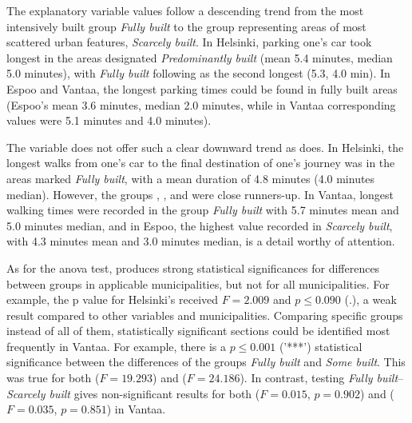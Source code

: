 The explanatory variable  values follow a descending trend from the most intensively built group \textit{Fully built} to the group representing areas of most scattered urban features, \textit{Scarcely built}. In Helsinki, parking one's car took longest in the areas designated \textit{Predominantly built} (mean 5.4 minutes, median 5.0 minutes), with \textit{Fully built} following as the second longest (5.3, 4.0 min). In Espoo and Vantaa, the longest parking times could be found in fully built areas (Espoo's mean 3.6 minutes, median 2.0 minutes, while in Vantaa corresponding values were 5.1 minutes and 4.0 minutes).

The variable  does not offer such a clear downward trend as  does. In Helsinki, the longest walks from one's car to the final destination of one's journey was in the areas marked \textit{Fully built}, with a mean duration of 4.8 minutes (4.0 minutes median). However, the groups , , and  were close runners-up. In Vantaa, longest walking times were recorded in the group \textit{Fully built} with 5.7 minutes mean and 5.0 minutes median, and in Espoo, the highest value recorded in \textit{Scarcely built}, with 4.3 minutes mean and 3.0 minutes median, is a detail worthy of attention.

As for the \acrshort{anova} test,  produces strong statistical significances for differences between groups in applicable municipalities, but not for all municipalities. For example, the p value for Helsinki's  received $F = 2.009$ and $p \leq 0.090$ (.), a weak result compared to other variables and municipalities. Comparing specific groups instead of all of them, statistically significant sections could be identified most frequently in Vantaa. For example, there is a $p \leq 0.001$ ('***') statistical significance between the differences of the groups \textit{Fully built} and \textit{Some built}. This was true for both  ($F = 19.293$) and  ($F = 24.186$). In contrast, testing \textit{Fully built}--\textit{Scarcely built} gives non-significant results for both  ($F = 0.015$, $p = 0.902$) and  ($F = 0.035$, $p = 0.851$) in Vantaa.

